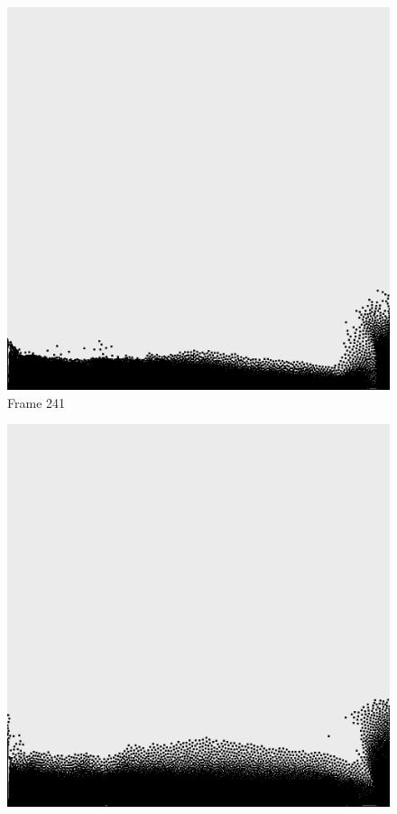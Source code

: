 \documentclass[a4paper, 12pt, oneside]{book}
\begin{document}
\begin{figure}[!ht]
    \addvspace{0.5ex}
        \begin{center}
            \includegraphics[width=\linewidth]{images/test_case_2/241.png}
            Frame 241
        \end{center}
    \endminipage
    \hfill
        \begin{center}
            \includegraphics[width=\linewidth]{images/test_case_2/261.png}

\end{center}
\end{figure}
\end{document}
